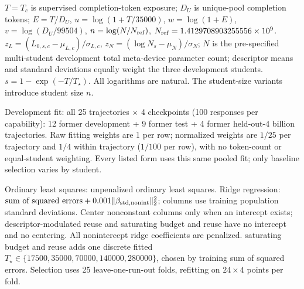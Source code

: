 \begin{minipage}{\textwidth}\scriptsize
$T=T_c$ is supervised completion-token exposure; $D_U$ is unique-pool completion tokens; $E=T/D_U$, $u=\log(1+T/35000)$, $w=\log(1+E)$, $v=\log(D_U/99504)$, $n=\log(N/N_{\rm ref})$, $N_{\rm ref}=1.4129708903255556\times10^9$. $z_L=(L_{0,s,c}-\mu_{L,c})/\sigma_{L,c}$, $z_N=(\log N_s-\mu_N)/\sigma_N$; $N$ is the pre-specified multi-student development total meta-device parameter count; descriptor means and standard deviations equally weight the three development students. $s=1-\exp(-T/T_\star)$. All logarithms are natural. The student-size variants introduce student size $n$.
\par Development fit: all 25 trajectories $\times$ 4 checkpoints (100 responses per capability): 12 former development + 9 former test + 4 former \mbox{held-out}-4 billion trajectories. Raw fitting weights are 1 per row; normalized weights are $1/25$ per trajectory and $1/4$ within trajectory ($1/100$ per row), with no token-count or equal-student weighting. Every listed form uses this same pooled fit; only baseline selection varies by student.
\par Ordinary least squares: unpenalized ordinary least squares. Ridge regression: $\text{sum of squared errors}+0.001\|\beta_{\rm std,nonint}\|_2^2$; columns use training population standard deviations. Center nonconstant columns only when an intercept exists; descriptor-modulated reuse and saturating budget and reuse have no intercept and no centering. All nonintercept ridge coefficients are penalized. saturating budget and reuse adds one discrete fitted $T_\star\in\{17500,35000,70000,140000,280000\}$, chosen by training sum of squared errors. Selection uses 25 leave-one-run-out folds, refitting on $24\times4$ points per fold.
\end{minipage}
\par\smallskip
\endgroup
